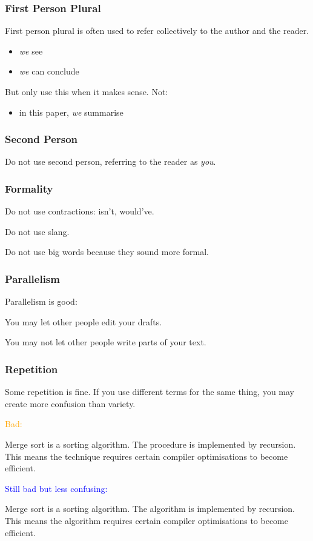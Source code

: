 \documentclass[xetex]{beamer}
\newcommand{\bad}[1]{\textcolor{orange}{#1}}
\newcommand{\good}[1]{\textcolor{blue}{#1}}
\begin{document}
\begin{frame}
  \frametitle{First Person Plural}

  First person plural is often used to refer collectively to the author and the reader.
  \begin{itemize}
    \item \emph{we} see
    \item \emph{we} can conclude
  \end{itemize}

  \medskip
  \pause

  But only use this when it makes sense. Not:
  \begin{itemize}
    \item in this paper, \emph{we} summarise
  \end{itemize}
\end{frame}

\begin{frame}
  \frametitle{Second Person}

  Do not use second person, referring to the reader as \emph{you}.
\end{frame}

\begin{frame}
  \frametitle{Formality}

  Do not use contractions: isn't, would've.

  \medskip
  \pause

  Do not use slang.

  \medskip
  \pause

  Do not use big words because they sound more formal.
\end{frame}

\begin{frame}
  \frametitle{Parallelism}

  Parallelism is good:

  \bigskip
  \pause

  You may let other people edit your drafts.

  You may not let other people write parts of your text.
\end{frame}

\begin{frame}
  \frametitle{Repetition}

  Some repetition is fine.
  If you use different terms for the same thing, you may create more confusion than variety.

  \medskip
  \pause

  \bad{Bad:}

  {
    \small
    Merge sort is a sorting algorithm.
    The procedure is implemented by recursion.
    This means the technique requires certain compiler optimisations to become efficient.
  }

  \medskip
  \pause

  \good{Still bad but less confusing:}

  {
    \small
    Merge sort is a sorting algorithm.
    The algorithm is implemented by recursion.
    This means the algorithm requires certain compiler optimisations to become efficient.
  }
\end{frame}
\end{document}
